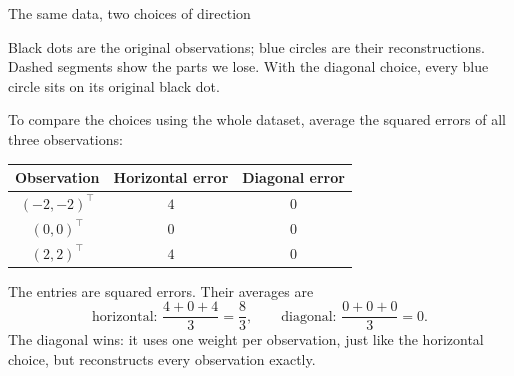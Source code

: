 \documentclass[a4paper,12pt,oneside]{report}
\begin{document}
\begin{framedexample}{The same data, two choices of direction}
\begin{center}
\end{center}

Black dots are the original observations; blue circles are their
reconstructions. Dashed segments show the parts we lose. With the
diagonal choice, every blue circle sits on its original black dot.

To compare the choices using the whole dataset, average the squared
errors of all three observations:
\begin{center}
\begin{tabular}{@{}ccc@{}}
\toprule
\textbf{Observation} & \textbf{Horizontal error} & \textbf{Diagonal error} \\
\midrule
$(-2,-2)^\top$ & $4$ & $0$ \\
$(0,0)^\top$ & $0$ & $0$ \\
$(2,2)^\top$ & $4$ & $0$ \\
\bottomrule
\end{tabular}
\end{center}
The entries are squared errors. Their averages are
\[
  \text{horizontal: }\frac{4+0+4}{3}=\frac83,
  \qquad
  \text{diagonal: }\frac{0+0+0}{3}=0.
\]
The diagonal wins: it uses one weight per observation, just like
the horizontal choice, but reconstructs every observation exactly.
\end{framedexample}
\end{document}
